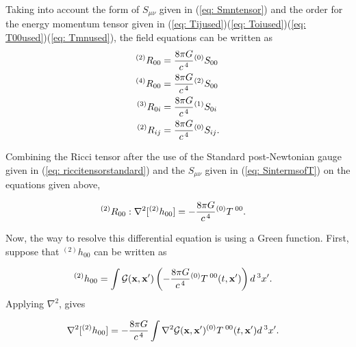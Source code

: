 Taking into account the form of $S_{\mu\nu}$ given in (\ref{eq: Smntensor}) and the order for the energy momentum tensor given in (\ref{eq: Tijused})(\ref{eq: Toiused})(\ref{eq: T00used})(\ref{eq: Tmnused}), the field equations can be written as
\begin{subequations}
\begin{align}
^{(2)}R_{00} &= \frac{8\pi G}{c^{\hspace{0.05cm}4}}{}^{(0)}S_{00}\\
^{(4)}R_{00} &= \frac{8\pi G}{c^{\hspace{0.05cm}4}}{}^{(2)}S_{00}\\
^{(3)}R_{0i} &= \frac{8\pi G}{c^{\hspace{0.05cm}4}}{}^{(1)}S_{0i}\\
^{(2)}R_{ij} &= \frac{8\pi G}{c^{\hspace{0.05cm}4}}{}^{(0)}S_{ij}.
\end{align}
\end{subequations}

Combining the Ricci tensor after the use of the Standard post-Newtonian gauge given in (\ref{eq: riccitensorstandard}) and the $S_{\mu\nu}$ given in (\ref{eq: SintermsofT}) on the equations given above,

\begin{align}
\label{eq: R00approx}
&^{(2)}R_{00}: \nabla^2[^{(2)}h_{00}] = -\frac{8\pi G}{c^{\hspace{0.05cm}4}}{}^{(0)}T{}^{\hspace{0.07cm}00}.
\end{align}

Now, the way to resolve this differential equation is using a Green function. First, suppose that $^{(2)}h_{00}$ can be written as

\begin{align}
&^{(2)}h_{00} = \int \mathcal{G}(\mathbf{x},\mathbf{x'})\left(-\frac{8\pi G}{c^{\hspace{0.05cm}4}}{}^{(0)}T{}^{\hspace{0.07cm}00}(t,\mathbf{x'})\right)d^{\hspace{0.07cm}3}x'.
\end{align}
Applying $\nabla^2$, gives

\begin{align}
&\nabla^2[^{(2)}h_{00}] = -\frac{8\pi G}{c^{\hspace{0.05cm}4}} \int \nabla^{2}{}\mathcal{G}(\mathbf{x},\mathbf{x'}){}^{(0)}T{}^{\hspace{0.07cm}00}(t,\mathbf{x'})d^{\hspace{0.07cm}3}x'.
\end{align}

